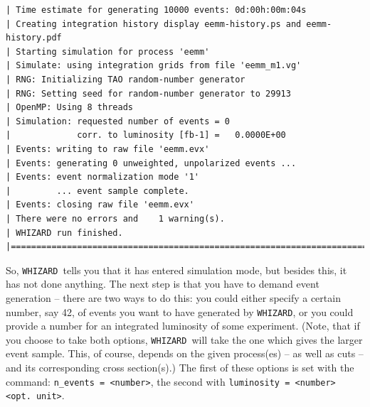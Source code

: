 \documentclass[12pt]{book}
\newcommand{\ttt}[1]{\texttt{#1}}
\newcommand{\whizard}{\ttt{WHIZARD}}
\begin{document}
\begin{footnotesize}
\begin{verbatim}
| Time estimate for generating 10000 events: 0d:00h:00m:04s
| Creating integration history display eemm-history.ps and eemm-history.pdf
| Starting simulation for process 'eemm'
| Simulate: using integration grids from file 'eemm_m1.vg'
| RNG: Initializing TAO random-number generator
| RNG: Setting seed for random-number generator to 29913
| OpenMP: Using 8 threads
| Simulation: requested number of events = 0
|             corr. to luminosity [fb-1] =   0.0000E+00
| Events: writing to raw file 'eemm.evx'
| Events: generating 0 unweighted, unpolarized events ...
| Events: event normalization mode '1'
|         ... event sample complete.
| Events: closing raw file 'eemm.evx'
| There were no errors and    1 warning(s).
| WHIZARD run finished.
|=============================================================================|
\end{verbatim}
\end{footnotesize}

So, \whizard\ tells you that it has entered simulation mode, but besides
this, it has not done anything. The next step is that you have to
demand event generation -- there are two ways to do this: you could
either specify a certain number, say 42, of events you want to have
generated by \whizard, or you could provide a number for an integrated
luminosity of some experiment. (Note, that if you choose to take both
options, \whizard\ will take the one which gives the larger event
sample. This, of course, depends on the given process(es) -- as well
as cuts -- and its corresponding cross section(s).) The first of these
options is set with the command: \ttt{n\_events = <number>}, the
second with \ttt{luminosity = <number> <opt. unit>}.
\end{document}
